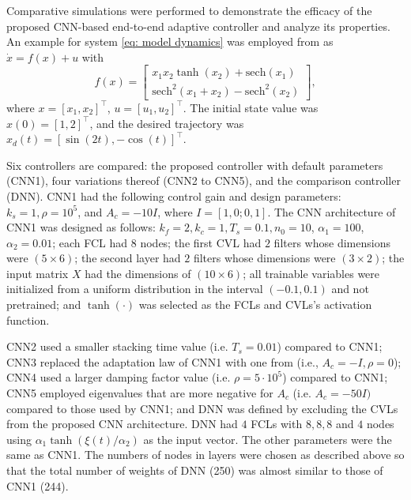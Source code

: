 \documentclass[letterpaper, 10 pt, conference]{ieeeconf}  %
\begin{document}
Comparative simulations were performed to demonstrate the efficacy of the proposed CNN-based end-to-end adaptive controller and analyze its properties. 
An example for system \eqref{eq: model dynamics} was employed from \cite{DixonDNN} as 
$\dot x = f(x) + u$ with
\begin{equation}
    f(x)
     = 
    \begin{bmatrix}
        x_1x_2\tanh(x_2)+\text{sech}(x_1)\\
        \text{sech}^2 (x_1+x_2) -\text{sech}^2(x_2)
    \end{bmatrix},
    \label{eq: sim dynamics}
\end{equation}
where $x=[x_1,x_2]^\top  $, $u=[u_1,u_2]^\top$. 
The initial state value was $x(0)=[1,2]^\top  $, and the desired trajectory was $x_d(t) = [\sin(2t),-\cos(t)]^\top  $. 

Six controllers are compared: the proposed controller with default parameters (CNN1), four variations thereof (CNN2 to CNN5), and the comparison controller (DNN). CNN1 had the following control gain and design parameters: $k_s=1, \rho=10^5$, and $A_c=-10I$, where $I = [1,0;0,1]$. The CNN architecture of CNN1 was designed as follows: $k_f=2, k_c=1, T_s=0.1, n_0 = 10$, $\alpha_1 = 100$, $\alpha_2=0.01$; each FCL had $8$ nodes; the first CVL had $2$ filters whose dimensions were $(5\times 6)$; the second layer had $2$ filters whose dimensions were $(3\times2)$; the input matrix $X$ had the dimensions of $(10\times 6)$; all trainable variables were initialized from a uniform distribution in the interval $(-0.1,0.1)$ and not pretrained; and $\tanh(\cdot)$ was selected as the FCLs and CVLs's activation function.

CNN2 used a smaller stacking time value (i.e. $T_s=0.01$) compared to CNN1; CNN3 replaced the adaptation law of CNN1 with one from \cite{DixonDNN} (i.e., $A_c=-I, \rho = 0$); CNN4 used a larger damping factor value (i.e. $\rho=5\cdot10^5$) compared to CNN1; CNN5 employed eigenvalues that are more negative for $A_c$ (i.e. $A_c=-50I)$ compared to those used by CNN1; and DNN was defined by excluding the CVLs from the proposed CNN architecture. 
DNN had $4$ FCLs with $8,8,8$ and $4$ nodes 
using $\alpha_1\tanh(\xi(t)/\alpha_2)$ as the input vector. The other parameters were the same as CNN1. 
The numbers of nodes in layers were chosen as described above so that the total number of weights of DNN (250) was almost similar to those of CNN1 (244).
\end{document}
